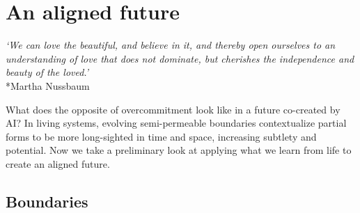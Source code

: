 \documentclass[12pt]{article}
\begin{document}






\section{An aligned future}

\begin{center}
\textit{`We can love the beautiful, and believe in it, and thereby open ourselves to an understanding of love that does not dominate, but cherishes the independence and beauty of the loved.'}\\*Martha Nussbaum
\end{center}

What does the opposite of overcommitment look like in a future co-created by AI? In living systems, evolving semi-permeable boundaries contextualize partial forms to be more long-sighted in time and space, increasing subtlety and potential. Now we take a preliminary look at applying what we learn from life to create an aligned future.


\subsection{Boundaries}
\end{document}

